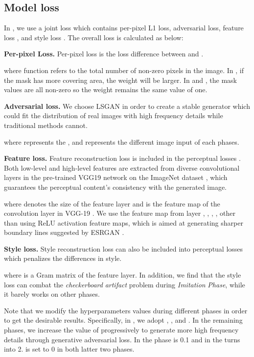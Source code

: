 \documentclass[10pt,twocolumn,letterpaper]{article} \usepackage{amsfonts,amssymb}
\begin{document}
\subsection{Model loss} \label{Model loss}
In , we use a joint loss which contains per-pixel L1 loss, adversarial loss, feature loss \cite{johnson2016perceptual}, and style loss \cite{gatys2016image}. The overall
loss is calculated as below:


{\bf Per-pixel Loss.}
Per-pixel loss is the  loss difference between  and .

where function  refers to the total number of non-zero pixels in the image. In , if the mask has more covering area, the weight will be larger. In  and , the mask values are all non-zero so the weight remains the same value of one.

{\bf Adversarial loss.}
We choose LSGAN \cite{mao2017least} in order to create a stable generator which could fit the distribution of real images with high frequency details while traditional methods cannot.


where  represents the , and  represents the different image input of each phases.

{\bf Feature loss.}
Feature reconstruction loss is included in the perceptual losses \cite{johnson2016perceptual}. Both low-level and high-level features are extracted from diverse convolutional layers in the pre-trained VGG19 network \cite{simonyan2014very} on the ImageNet dataset \cite{russakovsky2015imagenet}, which guarantees the perceptual content's consistency with the generated image.

where  denotes the size of the  feature layer and   is the feature map of the  convolution layer in VGG-19 \cite{simonyan2014very}. We use the feature map from layer , , , ,  other than using ReLU \cite{nair2010rectified} activation feature maps, which is aimed at generating sharper boundary lines suggested by ESRGAN \cite{wang2018esrgan}.

{\bf Style loss.}
Style reconstruction loss can also be included into perceptual losses \cite{johnson2016perceptual} which penalizes the differences in style.

where   is a Gram matrix of the  feature layer. In addition, we find that the style loss can combat  the \emph{checkerboard} \emph{artifact} \cite{odena2016deconvolution} problem during \emph{Imitation} \emph{Phase}, while it barely works on other phases.

Note that we modify the hyperparameters values during different phases in order to get the desirable results. Specifically, in  , we adopt , ,  and . In the remaining phases, we increase the value of  progressively to generate more high frequency details through generative adversarial loss. In the  phase  is 0.1 and in the   turns into 2.  is set to 0 in both latter two phases.
\end{document}
